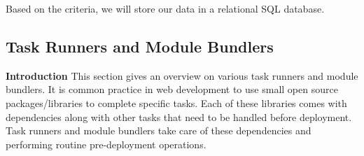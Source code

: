 \documentclass[draftclsnofoot,onecolumn,letterpaper,10pt]{IEEEtran}
\begin{document}
					Based on the criteria, we will store our data in a relational SQL database.\\

	\subsection{Task Runners and Module Bundlers}
			\textbf{Introduction}
					This section gives an overview on various task runners and module bundlers.
					It is common practice in web development to use small open source packages/libraries to complete specific tasks.
					Each of these libraries comes with dependencies along with other tasks that need to be handled before deployment.
					Task runners and module bundlers take care of these dependencies and performing routine pre-deployment operations.
\end{document}
